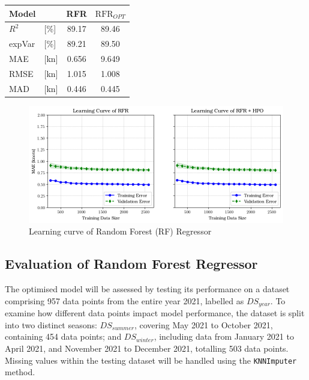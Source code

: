 \documentclass[]{interact}
\theoremstyle{plain}%
\theoremstyle{definition}
\theoremstyle{remark}
\begin{document}
\begin{table}
    {\begin{tabular}{l l c c}
    \hline
    Model   &       & RFR   	& $\text{RFR}_{OPT}$  \\
    \hline
    $R^2$   & [\%]  & 89.17   & 89.46               \\
    expVar  & [\%]  & 89.21   & 89.50               \\
    MAE     & [kn]  & 0.656   & 9.649               \\
    RMSE    & [kn]  & 1.015   & 1.008               \\
    MAD     & [kn]  & 0.446   & 0.445               \\  
    \hline
    \end{tabular}}
  \label{tbl:cv_rfr_j}
  \end{table}

\begin{figure}
    \centering
    \includegraphics[width=.8\linewidth]{00_figures/learning_curve_rfr_mae.png}
    \caption{Learning curve of Random Forest (RF) Regressor}
    \label{fig:learn_curve_RFR_MAE}
\end{figure}

\subsection{Evaluation of Random Forest Regressor}\label{sec:testing_discission_j}

The optimised model will be assessed by testing its performance on a dataset comprising 957 data points from the entire year 2021, labelled as $DS_{year}$. To examine how different data points impact model performance, the dataset is split into two distinct seasons: $DS_{summer}$, covering May 2021 to October 2021, containing 454 data points; and $DS_{winter}$, including data from January 2021 to April 2021, and November 2021 to December 2021, totalling 503 data points. Missing values within the testing dataset will be handled using the {\tt KNNImputer} method.
\end{document}
